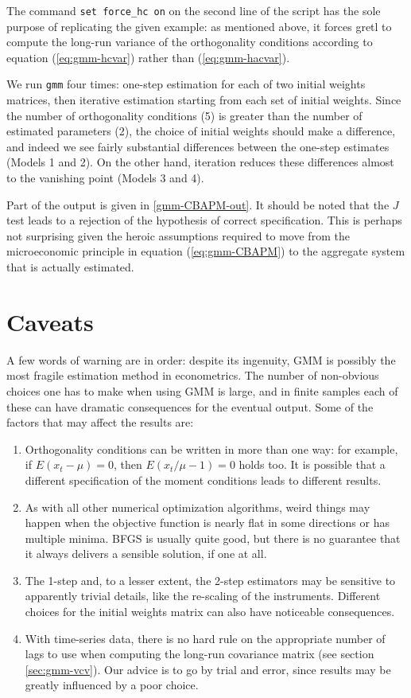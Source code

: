 The command \texttt{set force\_hc on} on the second line of the script
has the sole purpose of replicating the given example: as mentioned
above, it forces gretl to compute the long-run variance of the
orthogonality conditions according to equation (\ref{eq:gmm-hcvar})
rather than (\ref{eq:gmm-hacvar}).

We run \texttt{gmm} four times: one-step estimation for each of two
initial weights matrices, then iterative estimation starting from each
set of initial weights.  Since the number of orthogonality conditions
(5) is greater than the number of estimated parameters (2), the choice
of initial weights should make a difference, and indeed we see fairly
substantial differences between the one-step estimates (Models 1 and
2).  On the other hand, iteration reduces these differences almost to
the vanishing point (Models 3 and 4). 

Part of the output is given in \ref{gmm-CBAPM-out}.  It should be
noted that the $J$ test leads to a rejection of the hypothesis of
correct specification.  This is perhaps not surprising given the
heroic assumptions required to move from the microeconomic principle
in equation (\ref{eq:gmm-CBAPM}) to the aggregate system that is
actually estimated.


\section{Caveats}
\label{sec:gmm-caveat}

A few words of warning are in order: despite its ingenuity, GMM is
possibly the most fragile estimation method in econometrics. The
number of non-obvious choices one has to make when using GMM is large,
and in finite samples each of these can have dramatic consequences for
the eventual output. Some of the factors that may affect the results
are:
\begin{enumerate}
\item Orthogonality conditions can be written in more than one way:
  for example, if $E(x_t - \mu) = 0$, then $E(x_t/\mu - 1) =
  0$ holds too. It is possible that a different specification of the
  moment conditions leads to different results.
\item As with all other numerical optimization algorithms, weird
  things may happen when the objective function is nearly flat in some
  directions or has multiple minima. BFGS is usually quite good, but
  there is no guarantee that it always delivers a sensible solution,
  if one at all.
\item The 1-step and, to a lesser extent, the 2-step estimators may be
  sensitive to apparently trivial details, like the re-scaling of the
  instruments. Different choices for the initial weights matrix can
  also have noticeable consequences.
\item With time-series data, there is no hard rule on the appropriate
  number of lags to use when computing the long-run covariance matrix
  (see section \ref{sec:gmm-vcv}). Our advice is to go by trial and
  error, since results may be greatly influenced by a poor choice.
\end{enumerate}

